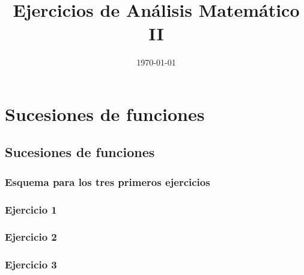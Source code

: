 \documentclass[11pt,spanish]{article} %
\title{Ejercicios de Análisis Matemático II}
\author{ }
\date{\today}
\begin{document}
\maketitle
\tableofcontents %
\newpage
\setlength\parindent{0pt} %

\section{Sucesiones de funciones}
\subsection{Sucesiones de funciones}
	\subsubsection{Esquema para los tres primeros ejercicios}
	
	\subsubsection{Ejercicio 1}
	
	\subsubsection{Ejercicio 2}
	
	\subsubsection{Ejercicio 3}
	
\end{document}
